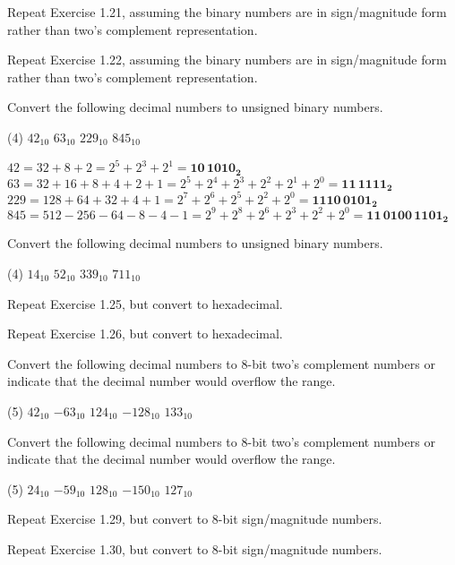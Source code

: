 \exercise %
Repeat Exercise 1.21, assuming the binary numbers are in sign/magnitude
form rather than two's complement representation.
\solution
{}

\exercise %
Repeat Exercise 1.22, assuming the binary numbers are in sign/magnitude
form rather than two's complement representation.
\solution
{}

\exercise %
Convert the following decimal numbers to unsigned
binary numbers.
\begin{tasks}(4)
	\task $42_{10}$
	\task $63_{10}$
	\task $229_{10}$
	\task $845_{10}$	
\end{tasks}
\solution
\begin{tasks}
	\task $42=32+8+2=2^5+2^3+2^1=\mathbf{10\,1010_2}$	
	\task $63=32+16+8+4+2+1=2^5+2^4+2^3+2^2+2^1+2^0=\mathbf{11\,1111_2}$
	\task $229=128+64+32+4+1=2^7+2^6+2^5+2^2+2^0=\mathbf{1110\,0101_2}$
	\task $845=512-256-64-8-4-1=2^9+2^8+2^6+2^3+2^2+2^0=\mathbf{11\,0100\,1101_2}$
\end{tasks}

\exercise %
Convert the following decimal numbers to unsigned binary numbers.
\begin{tasks}(4)
	\task $14_{10}$
	\task $52_{10}$
	\task $339_{10}$
	\task $711_{10}$
\end{tasks}

\exercise %
Repeat Exercise 1.25, but convert to hexadecimal.

\exercise %
Repeat Exercise 1.26, but convert to hexadecimal.

\exercise %
Convert the following decimal numbers to 8-bit two's complement numbers or
indicate that the decimal number would overflow the range.
\begin{tasks}(5)
	\task $42_{10}$
	\task $-63_{10}$
	\task $124_{10}$
	\task $-128_{10}$
	\task $133_{10}$
\end{tasks}

\exercise %
Convert the following decimal numbers to 8-bit two's complement numbers or
indicate that the decimal number would overflow the range.
\begin{tasks}(5)
	\task $24_{10}$
	\task $-59_{10}$
	\task $128_{10}$
	\task $-150_{10}$
	\task $127_{10}$
\end{tasks}

\exercise %
Repeat Exercise 1.29, but convert to 8-bit sign/magnitude numbers.

\exercise %
Repeat Exercise 1.30, but convert to 8-bit sign/magnitude numbers.

